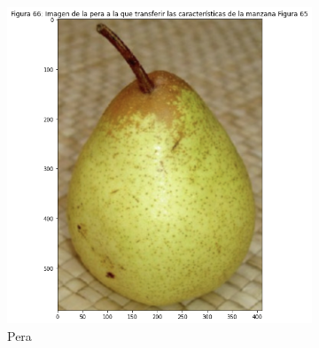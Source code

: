 \documentclass[11pt,twoside,titlepage,a4paper]{article}
\numberwithin{equation}{section} %
\theoremstyle{usual}
\begin{document}
\begin{figure}[h]
\begin{subfigure}[t]{.33\textwidth}
        \includegraphics[width=\textwidth]{imagenes/PoissonImageEditing_cell_77_output_1.png}
        \caption{Pera}
        \label{fig:peraIntercambioColor}
    \end{subfigure}%
    \centering
    \begin{subfigure}[t]{.24\textwidth}
        \centering

\end{subfigure}
\end{figure}
\end{document}
